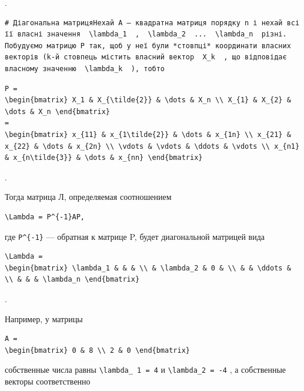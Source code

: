 \documentclass[
  ukrainian,
]{article}
\begin{document}
.

\begin{verbatim}
# Діагональна матрицяНехай A — квадратна матриця порядку n і нехай всі її власні значення  \lambda_1  ,  \lambda_2  ...  \lambda_n  різні. Побудуємо матрицю P так, щоб у неї були *стовпці* координати власних векторів (k-й стовпець містить власний вектор  X_k  , що відповідає власному значенню  \lambda_k  ), тобто
\end{verbatim}

\begin{verbatim}
P =
\begin{bmatrix} X_1 & X_{\tilde{2}} & \dots & X_n \\ X_{1} & X_{2} & \dots & X_n \end{bmatrix}
=
\begin{bmatrix} x_{11} & x_{1\tilde{2}} & \dots & x_{1n} \\ x_{21} & x_{22} & \dots & x_{2n} \\ \vdots & \vdots & \ddots & \vdots \\ x_{n1} & x_{n\tilde{3}} & \dots & x_{nn} \end{bmatrix}
\end{verbatim}

.

Тогда матрица Л, определяемая соотношением

\begin{verbatim}
\Lambda = P^{-1}AP,
\end{verbatim}

где \texttt{P\^{}\{-1\}} --- обратная к матрице P, будет диагональной
матрицей вида

\begin{verbatim}
\Lambda =
\begin{bmatrix} \lambda_1 & & & \\ & \lambda_2 & 0 & \\ & & \ddots & \\ & & & \lambda_n \end{bmatrix}
\end{verbatim}

.

Например, у матрицы

\begin{verbatim}
A =
\begin{bmatrix} 0 & 8 \\ 2 & 0 \end{bmatrix}
\end{verbatim}

собственные числа равны \texttt{\textbackslash{}lambda\_\ 1\ =\ 4} и
\texttt{\textbackslash{}lambda\_2\ =\ -4} , а собственные векторы
соответственно
\end{document}

